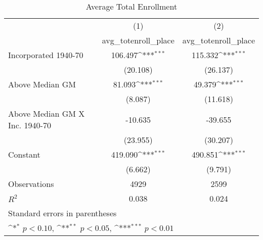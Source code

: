 \begin{table}[htbp]\centering
\def\sym#1{\ifmmode^{#1}\else\(^{#1}\)\fi}
\caption{Average Total Enrollment}
\begin{tabular}{l*{2}{c}}
\hline\hline
                    &\multicolumn{1}{c}{(1)}&\multicolumn{1}{c}{(2)}\\
                    &\multicolumn{1}{c}{avg\_totenroll\_place}&\multicolumn{1}{c}{avg\_totenroll\_place}\\
\hline
Incorporated 1940-70&     106.497\sym{***}&     115.332\sym{***}\\
                    &    (20.108)         &    (26.137)         \\
[1em]
Above Median GM     &      81.093\sym{***}&      49.379\sym{***}\\
                    &     (8.087)         &    (11.618)         \\
[1em]
Above Median GM X Inc. 1940-70&     -10.635         &     -39.655         \\
                    &    (23.955)         &    (30.207)         \\
[1em]
Constant            &     419.090\sym{***}&     490.851\sym{***}\\
                    &     (6.662)         &     (9.791)         \\
\hline
Observations        &        4929         &        2599         \\
\(R^{2}\)           &       0.038         &       0.024         \\
\hline\hline
\multicolumn{3}{l}{\footnotesize Standard errors in parentheses}\\
\multicolumn{3}{l}{\footnotesize \sym{*} \(p<0.10\), \sym{**} \(p<0.05\), \sym{***} \(p<0.01\)}\\
\end{tabular}
\end{table}
